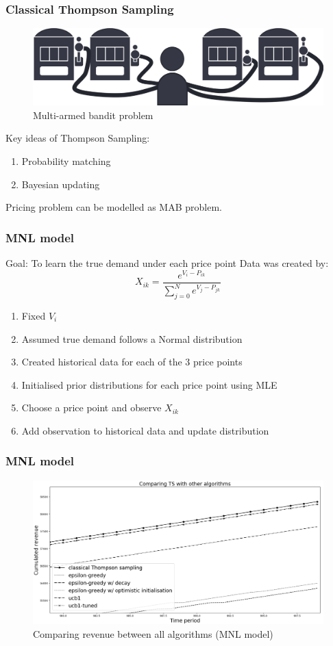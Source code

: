 \documentclass[11pt]{beamer}
\begin{document}
\begin{frame}
\frametitle{Classical Thompson Sampling}
\begin{figure}[h]
\centering
\includegraphics[width=1\textwidth]{mab.png}
\caption{Multi-armed bandit problem}
\end{figure}
Key ideas of Thompson Sampling:
\begin{enumerate}
\item Probability matching
\item Bayesian updating
\end{enumerate}
Pricing problem can be modelled as MAB problem.
\end{frame}

\begin{frame}
\frametitle{MNL model}
Goal: To learn the true demand under each price point
\newline
\newline
Data was created by:
\[X_{ik} = \frac{e^{V_i - P_{ik}}}{\sum_{j=0}^{N}e^{V_j - P_{jk}}}\]
\begin{enumerate}
\item Fixed $V_i$
\item Assumed true demand follows a Normal distribution
\item Created historical data for each of the 3 price points
\item Initialised prior distributions for each price point using MLE
\item Choose a price point and observe $X_{ik}$
\item Add observation to historical data and update distribution
\end{enumerate}

\end{frame}

\begin{frame}
\frametitle{MNL model}
\begin{figure}[h]
\centering
\includegraphics[width=1\textwidth]{Figure_1-4.png}
\caption{\label{fig:three}Comparing revenue between all algorithms (MNL model)}
\end{figure}
\end{frame}
\end{document}
